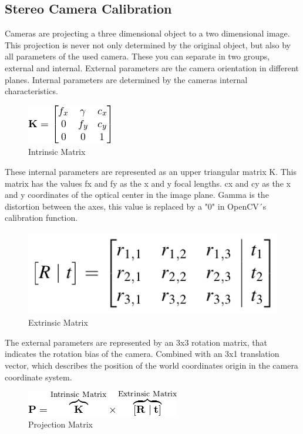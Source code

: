 \documentclass[journal,onecolumn]{IEEEtran}
\begin{document}
\subsection{Stereo Camera Calibration}
\noindent
Cameras are projecting a three dimensional object to a two dimensional image. This projection is never not only determined by the original object, but also by all parameters of the used camera. These you can separate in two groups, external and internal. External parameters are the camera orientation in different planes. Internal parameters are determined by the cameras internal characteristics.
\begin{figure}[H]
	\centering
	\includegraphics[scale=0.8]{intrinsicMatrix.png}
	\captionsetup{justification=centering}
	\caption{Intrinsic Matrix}
\end{figure}
\noindent
These internal parameters are represented as an upper triangular matrix K. This matrix has the values fx and fy as the x and y focal lengths. cx and cy as the x and y coordinates of the optical center in the image plane. Gamma is the distortion between the axes, this value is replaced by a "0" in OpenCV´s calibration function.\newline
\begin{figure}[H]
	\centering
	\includegraphics[scale=0.4]{extrinsicMatrix.png}
	\captionsetup{justification=centering}
	\caption{Extrinsic Matrix}
\end{figure}
\noindent
The external parameters are represented by an 3x3 rotation matrix, that indicates the rotation bias of the camera. Combined with an 3x1 translation vector, which describes the position of the world coordinates origin in the camera coordinate system.\newline
\begin{figure}[H]
	\centering
	\includegraphics[scale=0.7]{projectionMatrix.png}
	\captionsetup{justification=centering}
	\caption{Projection Matrix}
\end{figure}
\end{document}
